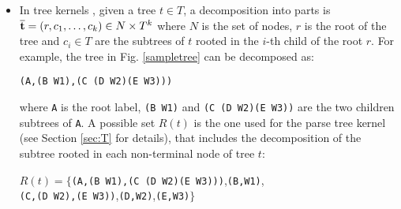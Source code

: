 \documentclass[twoside,11pt]{article}
\def\substr#1{{\bf\overline{#1}}}
\begin{document}
\begin{itemize}
\item
In tree kernels \cite{Collins2002}, given a tree $t \in T$, a decomposition into parts is $\substr{t} = (r,c_1,\ldots, c_k) \in N \times T^{k}$ where $N$ is the set of nodes, $r$ is the root of the tree and $c_i \in T$ are the subtrees of $t$ rooted in the $i$-th child of the root $r$.
For example, the tree in Fig. \ref{sampletree} can be decomposed as:
\begin{center}
 \texttt{(A,(B W1),(C (D W2)(E W3)))}
\end{center}
where \texttt{A} is the root label, \texttt{(B W1)} and \texttt{(C (D W2)(E W3))} are the two children subtrees of \texttt{A}.
A possible set $R(t)$ is the one used for the parse tree kernel (see Section \ref{sec:T} for details), that includes the decomposition of the subtree rooted in each non-terminal node of tree $t$:\\
\begin{center}
 $R(t)=\{$\texttt{(A,(B W1),(C (D W2)(E W3)))},\texttt{(B,W1)},\\\texttt{(C,(D W2),(E W3))},\texttt{(D,W2)},\texttt{(E,W3)}$\}$
\end{center}

\end{itemize}
\end{document}
